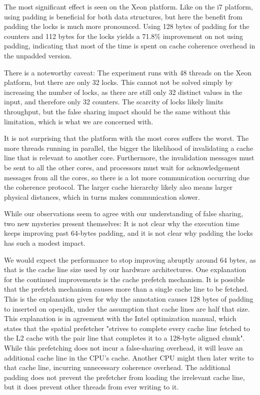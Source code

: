 The most significant effect is seen on the Xeon platform. Like on the i7
platform, using padding is beneficial for both data structures, but here the
benefit from padding the locks is much more pronounced. Using 128 bytes of
padding for the counters and 112 bytes for the locks yields a 71.8\% improvement
on not using padding, indicating that most of the time is spent on cache
coherence overhead in the unpadded version.

There is a noteworthy caveat: The experiment runs with 48 threads on the Xeon
platform, but there are only 32 locks.
This cannot not be solved simply by increasing the
number of locks, as there are still only 32 distinct values in the input, and
therefore only 32 counters.
The scarcity of locks likely limits
throughput, but the false sharing impact should be the same without
this limitation, which is what we are concerned with.

It is not surprising that the platform with the most cores suffers the worst.
The more threads running in parallel, the bigger the likelihood of invalidating
a cache line that is relevant to another core. Furthermore, the invalidation
messages must be sent to all the other cores, and processors must wait for
acknowledgement messages from all the cores, so there is a lot more
communication occurring due the coherence protocol. The larger cache hierarchy
likely also means larger physical distances, which in turns makes communication
slower.

While our observations seem to agree with our understanding of false sharing,
two new mysteries present themselves: It is not clear why the execution time
keeps improving past 64-bytes padding, and it is not clear why padding the locks
has such a modest impact.

We would expect the performance to stop improving abruptly around 64
bytes, as that is the cache line size used by our hardware architectures.
One explanation for the continued improvements is the cache prefetch mechanism.
It is possible that the prefetch mechanism causes more than a single cache line
to be fetched. This is the explanation given for why the 
annotation causes 128 bytes of padding to inserted on openjdk, under the
assumption that cache lines are half that size\cite{openjdkmailcontended}.
This explanation is in agreement with the Intel optimization
manual\cite{inteloptimize}, which states that the spatial prefetcher
"strives to complete every cache line fetched to the L2 cache with the pair line
that completes it to a 128-byte aligned chunk"\footnotemark. While this
prefetching does not incur a false-sharing overhead, it will leave an additional
cache line in the CPU's cache. Another CPU might then later write to that
cache line, incurring unnecessary coherence overhead. The additional padding
does not prevent the prefetcher from loading the irrelevant cache line, but it
does prevent other threads from ever writing to it.

